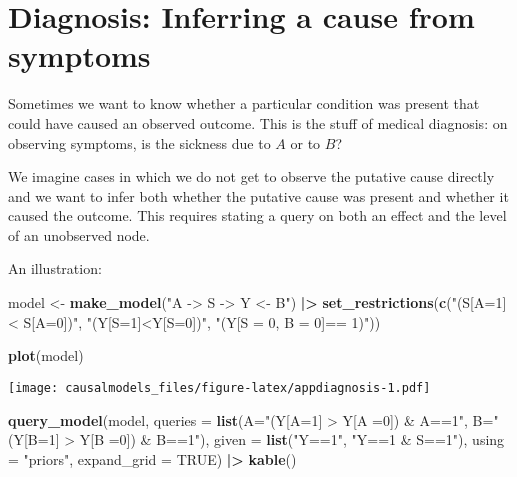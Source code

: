 \documentclass[
  12pt,
]{book}
\newenvironment{Shaded}{\begin{snugshade}}{\end{snugshade}}
\newcommand{\AttributeTok}[1]{\textcolor[rgb]{0.13,0.29,0.53}{#1}}
\newcommand{\ConstantTok}[1]{\textcolor[rgb]{0.56,0.35,0.01}{#1}}
\newcommand{\FunctionTok}[1]{\textcolor[rgb]{0.13,0.29,0.53}{\textbf{#1}}}
\newcommand{\NormalTok}[1]{#1}
\newcommand{\OtherTok}[1]{\textcolor[rgb]{0.56,0.35,0.01}{#1}}
\newcommand{\SpecialCharTok}[1]{\textcolor[rgb]{0.81,0.36,0.00}{\textbf{#1}}}
\newcommand{\StringTok}[1]{\textcolor[rgb]{0.31,0.60,0.02}{#1}}
\begin{document}
\hypertarget{diagnosis-inferring-a-cause-from-symptoms}{%
\section{Diagnosis: Inferring a cause from symptoms}\label{diagnosis-inferring-a-cause-from-symptoms}}

Sometimes we want to know whether a particular condition was present that could have caused an observed outcome. This is the stuff of medical diagnosis: on observing symptoms, is the sickness due to \(A\) or to \(B\)?

We imagine cases in which we do not get to observe the putative cause directly and we want to infer both whether the putative cause was present and whether it caused the outcome. This requires stating a query on both an effect and the level of an unobserved node.

An illustration:

\begin{Shaded}
\begin{Highlighting}[]
\NormalTok{model }\OtherTok{\textless{}{-}} \FunctionTok{make\_model}\NormalTok{(}\StringTok{"A {-}\textgreater{} S {-}\textgreater{} Y \textless{}{-} B"}\NormalTok{) }\SpecialCharTok{|\textgreater{}}
  \FunctionTok{set\_restrictions}\NormalTok{(}\FunctionTok{c}\NormalTok{(}\StringTok{"(S[A=1]\textless{} S[A=0])"}\NormalTok{, }
                   \StringTok{"(Y[S=1]\textless{}Y[S=0])"}\NormalTok{,}
                   \StringTok{"(Y[S = 0, B = 0]== 1)"}\NormalTok{))}

\FunctionTok{plot}\NormalTok{(model)}
\end{Highlighting}
\end{Shaded}

\texttt{[image: causalmodels\_files/figure-latex/appdiagnosis-1.pdf]}

\begin{Shaded}
\begin{Highlighting}[]
\FunctionTok{query\_model}\NormalTok{(model, }
       \AttributeTok{queries =} \FunctionTok{list}\NormalTok{(}\AttributeTok{A=}\StringTok{"(Y[A=1] \textgreater{} Y[A =0]) \& A==1"}\NormalTok{, }\AttributeTok{B=}\StringTok{"(Y[B=1] \textgreater{} Y[B =0]) \& B==1"}\NormalTok{),}
       \AttributeTok{given =} \FunctionTok{list}\NormalTok{(}\StringTok{"Y==1"}\NormalTok{,  }\StringTok{"Y==1 \& S==1"}\NormalTok{), }\AttributeTok{using =} \StringTok{"priors"}\NormalTok{, }
       \AttributeTok{expand\_grid =} \ConstantTok{TRUE}\NormalTok{) }\SpecialCharTok{|\textgreater{}} \FunctionTok{kable}\NormalTok{()}
\end{Highlighting}
\end{Shaded}
\end{document}
